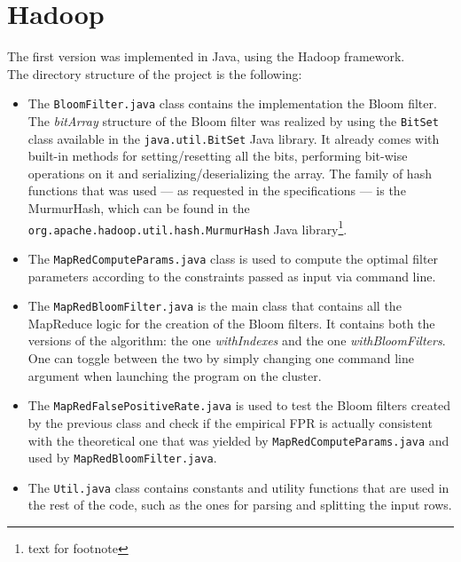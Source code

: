 %       
%
\chapter{Hadoop}\label{ch:hadoop}
The first version was implemented in Java, using the Hadoop framework.\\
The directory structure of the project is the following:\\
\hfill \break
\begin{itemize}
\item The \texttt{BloomFilter.java} class contains the implementation the Bloom filter.\\
The \textit{bitArray} structure of the Bloom filter was realized by using the \texttt{BitSet} class available in the \texttt{java.util.BitSet} Java library. It already comes with built-in methods for setting/resetting all the bits, performing bit-wise operations on it and serializing/deserializing the array.
The family of hash functions that was used --- as requested in the specifications --- is the MurmurHash, which can be found in the \texttt{org.apache.hadoop.util.hash.MurmurHash} Java library\footnote{text for footnote}.\\
\item The \texttt{MapRedComputeParams.java} class is used to compute the optimal filter parameters according to the constraints passed as input via command line.\\
\item The \texttt{MapRedBloomFilter.java} is the main class that contains all the MapReduce logic for the creation of the Bloom filters. It contains both the versions of the algorithm: the one \textit{withIndexes} and the one \textit{withBloomFilters}. One can toggle between the two by simply changing one command line argument when launching the program on the cluster.\\
\item The \texttt{MapRedFalsePositiveRate.java} is used to test the Bloom filters created by the previous class and check if the empirical FPR is actually consistent with the theoretical one that was yielded by \texttt{MapRedComputeParams.java} and used by \texttt{MapRedBloomFilter.java}.\\
\item The \texttt{Util.java} class contains constants and utility functions that are used in the rest of the code, such as the ones for parsing and splitting the input rows.\\
\end{itemize}


